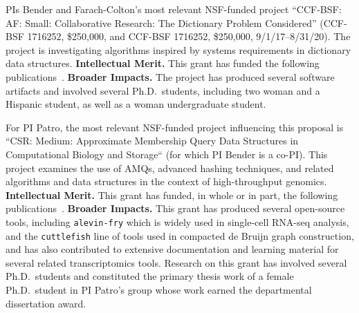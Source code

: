 PIs Bender and Farach-Colton's most relevant NSF-funded project ``CCF-BSF\@: AF\@: Small: Collaborative Research: The Dictionary Problem Considered''
(CCF-BSF 1716252, \$250,000, and CCF-BSF 1716252, \$250,000, 9/1/17--8/31/20).
The project is investigating algorithms inspired by systems requirements in dictionary data structures.
\textbf{Intellectual Merit.} This grant has funded  the following
publications~\cite{AgrawalBeDa20,AgrawalBeFi20,%
ArkinDaGa20,Ashkiani:2018:ADH,Ashkiani:2018:GLA,BenderChDa20,BenderCoFa19,BenderDaJo20,BenderFaGo18,%
BenderFaKu19,BenderGoMe20,BenderKoKu20,ChenMcSi18,ConwayBaJi17b,ConwayFaSh18,ConwayKnJi19,%
DasAgBe20,DasTsDu19,BerceaEv20a,BerceaEv20b,%
ZhanCoJi18,ZhanJaPo18,Mayer18,Pandey19,PandeyAlBe18,PandeyBJP17,%
PandeyBeJo18,Singh18,SinghMaBe20,%
JavanmardGaDa19DISC,%
GoswamiMeMe18,%
GeilFO18,pandey2020timely,%
EvenMeRa18,Awad:2019:EAH,BenderFiGi19,Farach-ColtonLiTs18,BenderKoPe18}.
%
\textbf{Broader Impacts.} The project has produced several software artifacts and involved several Ph.D.\ students, including two woman and a Hispanic student, as well as a woman undergraduate student.

For PI Patro, the most relevant NSF-funded project influencing this proposal is ``CSR: Medium: Approximate Membership Query Data Structures in Computational Biology and Storage`` (for which PI Bender is a co-PI).  This project examines the use of AMQs, advanced hashing techniques, and related algorithms and data structures in the context of high-throughput genomics.
\textbf{Intellectual Merit.} This grant has funded, in whole or in part, the following publications~\cite{Khan2021,Khan2022,Khan2023CapsSA,Almodaresi2021,almodaresi2022incrementally,he2022alevin,Srivastava2019,fan2023fulgor,fan2023spt,skoufos2022agamemnon,singh2023treeterminus,He2023,Pibiri2023MacDBG,wu2023seesaw,Karami2023,He2023Ambiguity,Fan2022Perplexity,Mu2022Airpart,AlmodaresiPFJP19,Soneson2021,Srivastava2020AlnMap,Srivastava2020BayesianSharing,Sarkar2020Terminus,Love2020Tximeta,Marais2019Sketching,VandenBerge2019,Zhu2019,Zakeri2021LikeForLike,Sarkar2019Minnow,VanBuren2021}.
\textbf{Broader Impacts.} This grant has produced several open-source tools, including \texttt{alevin-fry} which is widely used in single-cell RNA-seq analysis, and the \texttt{cuttlefish} line of tools used in compacted de Bruijn graph construction, and has also contributed to extensive documentation and learning material for several related transcriptomics tools. Research on this grant has involved several Ph.D.\ students and constituted the primary thesis work of a female Ph.D.\ student in PI Patro's group whose work earned the departmental dissertation award. 